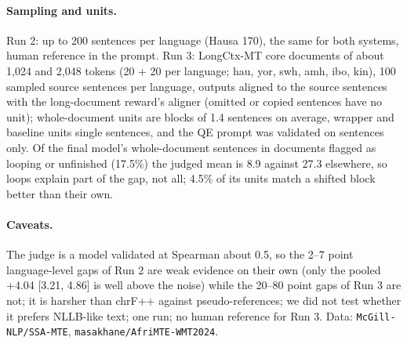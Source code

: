 \paragraph{Sampling and units.} Run 2: up to 200 \nopair{} sentences per language (Hausa 170), the same for both systems, human reference in the prompt. Run 3: LongCtx-MT core documents of about 1,024 and 2,048 tokens (20 + 20 per language; hau, yor, swh, amh, ibo, kin), 100 sampled source sentences per language, outputs aligned to the source sentences with the long-document reward's aligner (omitted or copied sentences have no unit); whole-document units are blocks of 1.4 sentences on average, wrapper and baseline units single sentences, and the QE prompt was validated on sentences only. Of the final model's whole-document sentences in documents flagged as looping or unfinished (17.5\%) the judged mean is 8.9 against 27.3 elsewhere, so loops explain part of the gap, not all; 4.5\% of its units match a shifted block better than their own.



\paragraph{Caveats.} The judge is a model validated at Spearman about 0.5, so the 2--7 point language-level gaps of Run 2 are weak evidence on their own (only the pooled +4.04 [3.21, 4.86] is well above the noise) while the 20--80 point gaps of Run 3 are not; it is harsher than chrF++ against pseudo-references; we did not test whether it prefers NLLB-like text; one run; no human reference for Run 3. Data: \texttt{McGill-NLP/SSA-MTE}, \texttt{masakhane/AfriMTE-WMT2024}.

